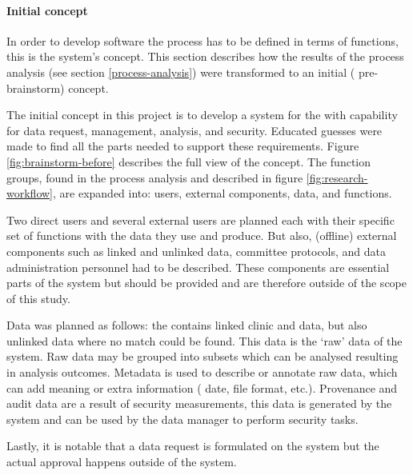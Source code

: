 
\paragraph{Initial concept}
In order to develop software the process has to be defined in terms of functions, this is the system's concept.
This section describes how the results of the process analysis (see section \ref{process-analysis}) were transformed to an initial (\ie{} pre-brainstorm) concept.

The initial concept in this project is to develop a system for the \projectdata{} with capability for data request, management, analysis, and security.
Educated guesses were made to find all the parts needed to support these requirements.
Figure \ref{fig:brainstorm-before} describes the full view of the concept. 
The function groups, found in the process analysis and described in figure \ref{fig:research-workflow}, are expanded into: users, external components, data, and functions.

Two direct users and several external users are planned each with their specific set of functions with the data they use and produce.
But also, (offline) external components such as linked and unlinked data, committee protocols, and data administration personnel had to be described.
These components are essential parts of the system but should be provided and are therefore outside of the scope of this study.

Data was planned as follows: the \projectdata{} contains linked clinic and \PRN{} data, but also unlinked data where no match could be found.
This data is the `raw' data of the system.
Raw data may be grouped into subsets which can be analysed resulting in analysis outcomes.
Metadata is used to describe or annotate raw data, which can add meaning or extra information (\eg{} date, file format, etc.).
Provenance and audit data are a result of security measurements, this data is generated by the system and can be used by the data manager to perform security tasks.

Lastly, it is notable that a data request is formulated on the system but the actual approval happens outside of the system.

